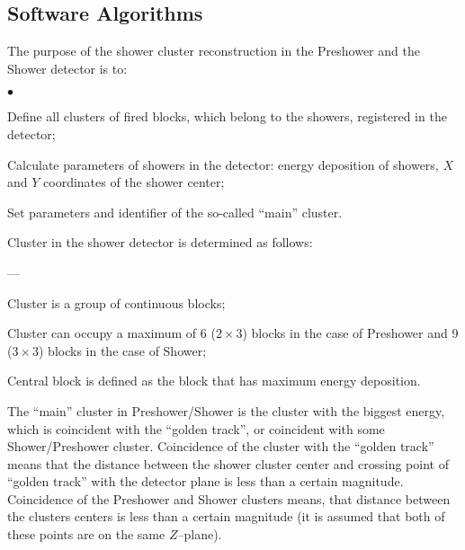 \subsection{Software Algorithms}

The purpose of the shower cluster reconstruction in the Preshower and 
the Shower detector is to:
\begin{list}{$\bullet$}{}
\item Define all clusters of fired blocks, which belong to the showers, 
      registered in the detector;
\item Calculate parameters of showers in the detector: energy deposition of 
      showers, $X$ and $Y$ coordinates of the shower center;
\item Set parameters and identifier of the so-called ``main'' cluster.
\end{list}

\noindent Cluster in the shower detector is determined as follows:
\begin{list}{---}{}
\item Cluster is a group of continuous blocks; 
\item Cluster can occupy a maximum of 6 ($2 \times 3$) blocks in the case of 
      Preshower and 9 ($3 \times 3$) blocks in the case of Shower; 
\item Central block is defined as the block that has maximum energy deposition.
\end{list}

The ``main'' cluster in Preshower/Shower is the cluster with the biggest 
energy, which is coincident with the ``golden track'', or coincident with some 
Shower/Preshower cluster.
Coincidence of the cluster with the ``golden track'' means that the
distance between the
shower cluster center and crossing point of ``golden track'' with
the detector plane is less than a certain magnitude.
Coincidence of the Preshower and Shower clusters means,
that distance between the 
clusters centers is less than a certain magnitude (it is  assumed that both of
these points are on the same $Z$--plane).

